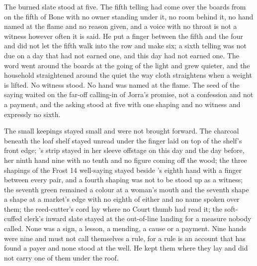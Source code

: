 \scenebreak

The burned slate stood at five. The fifth telling had come over the boards from  on the fifth of Bone with no owner standing under it, no room behind it, no hand named at the flame and no reason given, and a voice with no throat is not a witness however often it is said. He put a finger between the fifth and the four and did not let the fifth walk into the row and make six; a sixth telling was not due on a day that had not earned one, and this day had not earned one. The word went around the boards at the going of the light and  grew quieter, and the household straightened around the quiet the way cloth straightens when a weight is lifted. No witness stood. No hand was named at the flame. The seed of the saying waited on the far-off calling-in of Jorra's promise, not a confession and not a payment, and the asking stood at five with one shaping and no witness and expressly no sixth.

The small keepings stayed small and were not brought forward. The charcoal beneath the loaf shelf stayed unread under the finger laid on top of the shelf's front edge; 's strip stayed in her sleeve offstage on this day and the day before, her ninth hand nine with no tenth and no figure coming off the wood; the three shapings of the Frost 14 well-saying stayed beside 's eighth hand with a finger between every pair, and a fourth shaping was not to be stood up as a witness; the seventh green remained a colour at a woman's mouth and the seventh shape a shape at a market's edge with no eighth of either and no name spoken over them; the reed-cutter's cord lay where no Court thumb had read it; the soft-cuffed clerk's inward slate stayed at the out-of-line landing for a measure nobody called. None was a sign, a lesson, a mending, a cause or a payment. Nine hands were nine and must not call themselves a rule, for a rule is an account that has found a payer and none stood at the well. He kept them where they lay and did not carry one of them under the roof.

